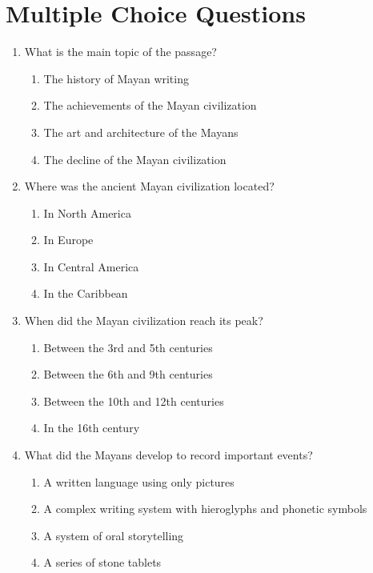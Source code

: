 \documentclass[12pt]{article}
\begin{document}
\newpage

\section*{Multiple Choice Questions}

\begin{enumerate}

\item What is the main topic of the passage?
\begin{enumerate}[label=\Alph*.]
    \item The history of Mayan writing
    \item The achievements of the Mayan civilization
    \item The art and architecture of the Mayans
    \item The decline of the Mayan civilization
\end{enumerate}

\vspace{0.5cm}

\item Where was the ancient Mayan civilization located?
\begin{enumerate}[label=\Alph*.]
    \item In North America
    \item In Europe
    \item In Central America
    \item In the Caribbean
\end{enumerate}

\vspace{0.5cm}

\item When did the Mayan civilization reach its peak?
\begin{enumerate}[label=\Alph*.]
    \item Between the 3rd and 5th centuries
    \item Between the 6th and 9th centuries
    \item Between the 10th and 12th centuries
    \item In the 16th century
\end{enumerate}

\vspace{0.5cm}

\item What did the Mayans develop to record important events?
\begin{enumerate}[label=\Alph*.]
    \item A written language using only pictures
    \item A complex writing system with hieroglyphs and phonetic symbols
    \item A system of oral storytelling
    \item A series of stone tablets
\end{enumerate}


\end{enumerate}
\end{document}
